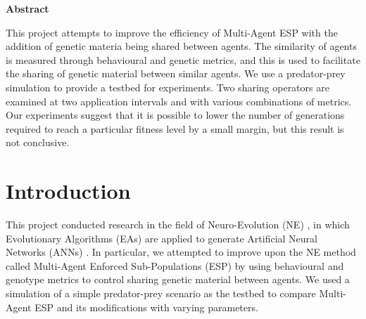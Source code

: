 \documentclass[12pt]{article} %
\begin{document}
\thispagestyle{empty}
\begin{center}
{\LARGE \bfseries Abstract}\\[0.5cm]
\end{center}

This project attempts to improve the efficiency of Multi-Agent ESP with the addition of genetic materia being shared between agents. The similarity of agents is measured through behavioural and genetic metrics, and this is used to facilitate the sharing of genetic material between similar agents. We use a predator-prey simulation to provide a testbed for experiments. Two sharing operators are examined at two application intervals and with various combinations of metrics. Our experiments suggest that it is possible to lower the number of generations required to reach a particular fitness level by a small margin, but this result is not conclusive.

\newpage

\thispagestyle{empty}
\tableofcontents
\newpage

\thispagestyle{empty}
\listoftables
\newpage

\setcounter{page}{1}

\section{Introduction}

This project conducted research in the field of Neuro-Evolution (NE) \cite{Montana1989}, in which Evolutionary Algorithms (EAs) \cite{Back1993} are applied to generate Artificial Neural Networks (ANNs) \cite{Yegnanarayana2004}. In particular, we attempted to improve upon the NE method called Multi-Agent Enforced Sub-Populations (ESP) \cite{Moriarty1997}\cite{Yong2001} by using behavioural and genotype metrics to control sharing genetic material between agents. We used a simulation of a simple predator-prey scenario \cite{Gomez1997} as the testbed to compare Multi-Agent ESP and its modifications with varying parameters.
\end{document}
